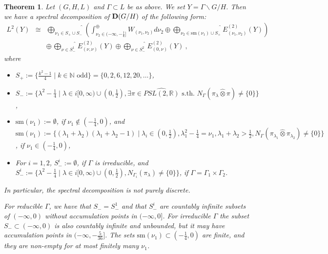 \documentclass[10]{amsart}
\newtheorem{thm}{Theorem}[section]
\theoremstyle{remark}
\theoremstyle{definition}
\numberwithin{equation}{section}
\newcommand{\N}{\mathbb{N}}           %
\begin{document}
{\begin{thm}\label{surprise}
Let $(G,H,L)$ and $\Gamma\subset L$ be as above. We set $Y=\Gamma\backslash G/H$. Then we have a spectral decomposition of ${\bf D}(G/H)$ of the following form:
\begin{eqnarray}\label{wums}
L^2(Y)&\cong& \widehat{\bigoplus_{\nu_1\in S_+\cup S_-}}\left (\int_{\nu_2\in (-\infty,-\frac{1}{4}]}^\oplus  W_{(\nu_1,\nu_2)} d\nu_2  \oplus \widehat{\bigoplus_{\nu_2\in\mathrm{sm}(\nu_1)\cup S_+}}
E^{(2)}_{(\nu_1,\nu_2)}(Y)    \right )\\
\nonumber&& \oplus\, \widehat{\bigoplus_{\nu\in S^1_-}} E^{(2)}_{(\nu,\nu)}(Y)  \oplus \widehat{\bigoplus_{\nu\in S^2_-}} E^{(2)}_{(0,\nu)}(Y)  \ , 
\end{eqnarray}
where
\begin{itemize}
\item $S_+:=\{\frac{k^2-1}{4}\mid k\in\N\mbox{ odd}\}=\{0,2,6,12,20,\dots\}$,
\item $S_-:=\{\lambda^2-\frac{1}{4}\mid \lambda\in i[0,\infty)\cup(0,\frac{1}{2}), \exists \pi\in \widehat{PSL(2,\mathbb{R})}\mbox{ s.th. } N_\Gamma(\pi_\lambda\hat\otimes\pi)\ne\{0\}\}$
,
\item  $\mathrm{sm}(\nu_1):=\emptyset$, if $\nu_1\not\in (-\frac{1}{4}, 0)$,  and \\
$\mathrm{sm}(\nu_1):=\{(\lambda_1+\lambda_2)(\lambda_1+\lambda_2-1)\mid \lambda_i\in (0,\frac{1}{2}), \lambda_1^2-
\frac{1}{4}=\nu_1, \lambda_1+\lambda_2>
\frac{1}{2} , 
N_\Gamma(\pi_{\lambda_1}\hat\otimes\pi_{\lambda_2})\ne\{0\}\} $, if $\nu_1\in (-\frac{1}{4}, 0)$,
\item For $i=1,2$, $S^i_-:=\emptyset$, if $\Gamma$ is irreducible, and \\
$S^i_-:=\{\lambda^2-\frac{1}{4}\mid \lambda\in i[0,\infty)\cup(0,\frac{1}{2}), N_{\Gamma_i}(\pi_\lambda)\not=\{0\}\}$, if $\Gamma=\Gamma_1\times \Gamma_2$.
\end{itemize}
In particular, the spectral decomposition is not purely discrete.

For reducible $\Gamma$, we have that $S_-=S^1_-$ and that $S^i_-$ are countably infinite subsets of $(-\infty,0)$ without accumulation points in $(-\infty,0]$. For irreducible $\Gamma$
the subset $S_-\subset (-\infty,0)$ is also countably infinite and unbounded, but it may have accumulation points in $(-\infty,-\frac{5}{36}]$. The sets $\mathrm{sm}(\nu_1)\subset (-\frac{1}{4}, 0)$ are finite, and they are non-empty for at most finitely many $\nu_1$.


\end{thm}}
\end{document}
